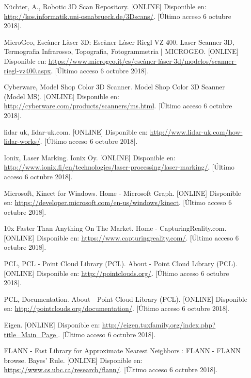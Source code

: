 \begin{thebibliography}{99}
 Nüchter, A., Robotic 3D Scan Repository. [ONLINE] Disponible en: \url{http://kos.informatik.uni-osnabrueck.de/3Dscans/}. [Último acceso 6 octubre 2018].


 MicroGeo, Escàner Làser 3D: Escàner Làser Riegl VZ-400. Laser Scanner 3D, Termografia Infrarosso, Topografia, Fotogrammetria | MICROGEO. [ONLINE] Disponible en: \url{https://www.microgeo.it/es/escàner-làser-3d/modelos/scanner-riegl-vz400.aspx}. [Último acceso 6 octubre 2018].


 Cyberware, Model Shop Color 3D Scanner. Model Shop Color 3D Scanner (Model MS). [ONLINE] Disponible en: \url{http://cyberware.com/products/scanners/ms.html}. [Último acceso 6 octubre 2018].


 lidar uk, lidar-uk.com. [ONLINE] Disponible en: \url{http://www.lidar-uk.com/how-lidar-works/}. [Último acceso 6 octubre 2018].

 Ionix, Laser Marking. Ionix Oy. [ONLINE] Disponible en: \url{http://www.ionix.fi/en/technologies/laser-processing/laser-marking/}. [Último acceso 6 octubre 2018].


 Microsoft, Kinect for Windows. Home - Microsoft Graph. [ONLINE] Disponible en: \url{https://developer.microsoft.com/en-us/windows/kinect}. [Último acceso 6 octubre 2018].


 10x Faster Than Anything On The Market. Home - CapturingReality.com. [ONLINE] Disponible en: \url{https://www.capturingreality.com/}. [Último acceso 6 octubre 2018].


 PCL, PCL - Point Cloud Library (PCL). About - Point Cloud Library (PCL). [ONLINE] Disponible en: \url{http://pointclouds.org/}. [Último acceso 6 octubre 2018].


 PCL, Documentation. About - Point Cloud Library (PCL). [ONLINE] Disponible en: \url{http://pointclouds.org/documentation/}. [Último acceso 6 octubre 2018].



 Eigen. [ONLINE] Disponible en: \url{ http://eigen.tuxfamily.org/index.php?title=Main_Page }. [Último acceso 6 octubre 2018].

 FLANN - Fast Library for Approximate Nearest Neighbors : FLANN - FLANN browse. Bayes' Rule. [ONLINE] Disponible en: \url{https://www.cs.ubc.ca/research/flann/}. [Último acceso 6 octubre 2018].


\end{thebibliography}
